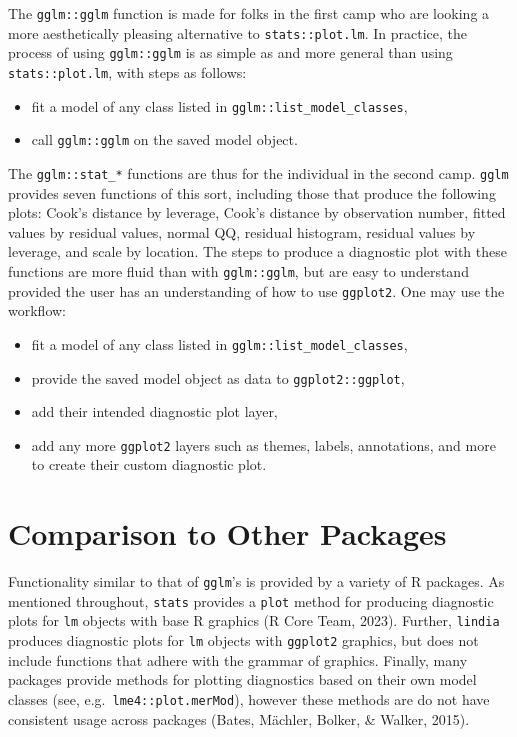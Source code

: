 \documentclass[10pt,a4paper,onecolumn]{article}
\providecommand{\tightlist}{%
  \setlength{\itemsep}{0pt}\setlength{\parskip}{0pt}}
\begin{document}
The \texttt{gglm::gglm} function is made for folks in the first camp who
are looking a more aesthetically pleasing alternative to
\texttt{stats::plot.lm}. In practice, the process of using
\texttt{gglm::gglm} is as simple as and more general than using
\texttt{stats::plot.lm}, with steps as follows:

\begin{itemize}
\tightlist
\item
  fit a model of any class listed in
  \texttt{gglm::list\_model\_classes},
\item
  call \texttt{gglm::gglm} on the saved model object.
\end{itemize}

The \texttt{gglm::stat\_*} functions are thus for the individual in the
second camp. \texttt{gglm} provides seven functions of this sort,
including those that produce the following plots: Cook's distance by
leverage, Cook's distance by observation number, fitted values by
residual values, normal QQ, residual histogram, residual values by
leverage, and scale by location. The steps to produce a diagnostic plot
with these functions are more fluid than with \texttt{gglm::gglm}, but
are easy to understand provided the user has an understanding of how to
use \texttt{ggplot2}. One may use the workflow:

\begin{itemize}
\tightlist
\item
  fit a model of any class listed in
  \texttt{gglm::list\_model\_classes},
\item
  provide the saved model object as data to \texttt{ggplot2::ggplot},
\item
  add their intended diagnostic plot layer,
\item
  add any more \texttt{ggplot2} layers such as themes, labels,
  annotations, and more to create their custom diagnostic plot.
\end{itemize}

\hypertarget{comparison-to-other-packages}{%
\section{Comparison to Other
Packages}\label{comparison-to-other-packages}}

Functionality similar to that of \texttt{gglm}'s is provided by a
variety of R packages. As mentioned throughout, \texttt{stats} provides
a \texttt{plot} method for producing diagnostic plots for \texttt{lm}
objects with base R graphics (R Core Team, 2023). Further,
\texttt{lindia} produces diagnostic plots for \texttt{lm} objects with
\texttt{ggplot2} graphics, but does not include functions that adhere
with the grammar of graphics. Finally, many packages provide methods for
plotting diagnostics based on their own model classes (see,
e.g.~\texttt{lme4::plot.merMod}), however these methods are do not have
consistent usage across packages (Bates, Mächler, Bolker, \& Walker,
2015).
\end{document}
